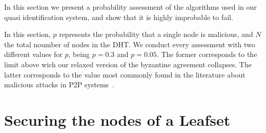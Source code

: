 In this section we present a probability assessment of
the algorithms used in our quasi identification system, and show that it is highly
improbable to fail.

In this section, $p$ represents the probability that a single node is
malicious, and $N$ the total noumber of nodes in the DHT. We conduct every
assessment with two different values for $p$, being $p = 0.3$ and $p = 0.05$.
The former corresponds to the limit above wich our relaxed version of the
byzantine agreement collapses. The latter corresponds to the value most
commonly found in the literature about malicious attacks in P2P
systems~\cite{p2p_certification}.


\section{Securing the nodes of a Leafset}
\label{sec:eval_leafset}
  

